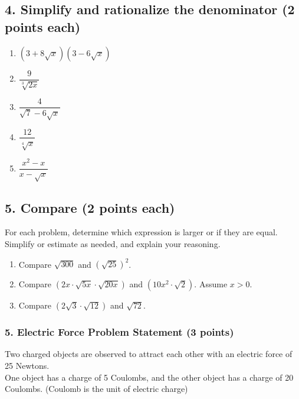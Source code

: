 \documentclass{hw}
\begin{document}
\newpage
\subsection*{\normalsize 4. Simplify and rationalize the denominator (2 points each)}
\begin{enumerate}[label=\alph*.]
    \item $(3 + 8\sqrt{x}) (3 - 6\sqrt{x})$
        \studentxxlargeworkspace
    \item $\dfrac{9}{\sqrt[3]{2x}}$
        \studentxxlargeworkspace
    \item $\dfrac{4}{\sqrt{7} - 6\sqrt{x}}$
        \studentxxlargeworkspace
    \item $\dfrac{12}{\sqrt[4]{x}}$
        \studentxxlargeworkspace
    \item $\dfrac{x^2 - x}{x - \sqrt{x}}$
        \studentxxlargeworkspace
\end{enumerate}

\subsection*{\normalsize 5. Compare (2 points each)}
For each problem, determine which expression is larger or if they are equal. Simplify or estimate as needed, and explain your reasoning.

\begin{enumerate}[label=\alph*.]
    \item Compare $\sqrt{300}$ and $\left( \sqrt{25} \right)^2$.
    \studentxxlargeworkspace

    \item Compare $(2x \cdot \sqrt{5x} \cdot \sqrt{20x})$ and $(10x^2 \cdot \sqrt{2})$. Assume $x > 0$.
    \studentxxlargeworkspace

    \item Compare $(2\sqrt{3} \cdot \sqrt{12})$ and $\sqrt{72}$.
    \studentxxlargeworkspace
\end{enumerate}

\newpage
\subsubsection*{\normalsize 5. Electric Force Problem Statement (3 points)}
Two charged objects are observed to attract each other with an electric force of 25 Newtons.\\
One object has a charge of 5 Coulombs, and the other object has a charge of 20 Coulombs. (Coulomb is the unit of electric charge)\\
\end{document}
